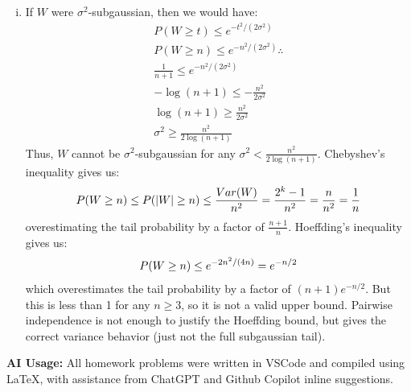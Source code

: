 \documentclass[11pt,a4paper,margin=1in]{article}
\begin{document}
\begin{enumerate}[(a)]
\begin{enumerate}[i.]
        will make the product 0, making $W = -1$. Only if all $\epsilon_i = 1$ 
        will the product be nonzero, making $W = 2^k - 1 = n$. Since all $\epsilon_i$ 
        are independent, $P(\epsilon_1 = 1, \dots, \epsilon_k = 1) = P(W = n) = (1/2)^k$,
        thus $P(W = n) = 1/(n + 1)$. $n$ is also the largest possible value of $W$,
        so $P(W \geq n) = P(W = n) = 1/(n + 1)$.
        \item If $W$ were $\sigma^2$-subgaussian, then we would have:
        \begin{gather*}
            P(W \geq t) \leq e^{-t^2/(2\sigma^2)} \\
            P(W \geq n) \leq e^{-n^2/(2\sigma^2)} \therefore \\
            \frac{1}{n + 1} \leq e^{-n^2/(2\sigma^2)} \\
            -\log(n + 1) \leq -\frac{n^2}{2\sigma^2} \\
            \log(n + 1) \geq \frac{n^2}{2\sigma^2} \\
            \sigma^2 \geq \frac{n^2}{2\log(n + 1)}
        \end{gather*}
        Thus, $W$ cannot be $\sigma^2$-subgaussian for any $\sigma^2 < \frac{n^2}{2\log(n + 1)}$.
        Chebyshev's inequality gives us:
        \[
            P(W \geq n) \leq P(|W| \geq n) \leq \frac{Var(W)}{n^2} = \frac{2^k - 1}{n^2} = \frac{n}{n^2} = \frac{1}{n} \\
        \]
        overestimating the tail probability by a factor of $\frac{n + 1}{n}$.
        Hoeffding's inequality gives us:
        \[
            P(W \geq n) \leq e^{-2n^2/(4n)} = e^{-n/2} \\
        \]
        which overestimates the tail probability by a factor of $(n + 1)e^{-n/2}$.
        But this is less than 1 for any $n \geq 3$, so it is not a valid upper
        bound. Pairwise independence is not enough to justify the Hoeffding bound,
        but gives the correct variance behavior (just not the full subgaussian tail).
    \end{enumerate}
\end{enumerate}

\noindent 
\textbf{AI Usage:} All homework problems were written in VSCode and compiled using LaTeX, with 
assistance from ChatGPT and Github Copilot inline suggestions.
\end{document}
